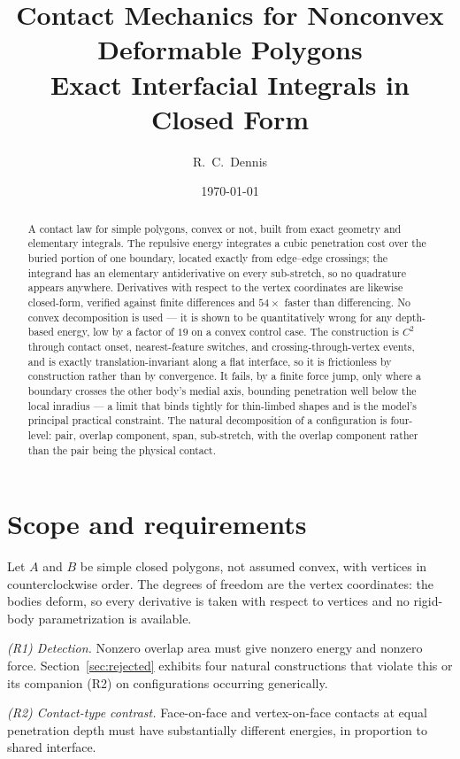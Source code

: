 \documentclass[11pt]{article}
\title{Contact Mechanics for Nonconvex Deformable Polygons\\[0.3em]
\large Exact Interfacial Integrals in Closed Form}
\author{R.\ C.\ Dennis}
\date{\today}
\begin{document}
\maketitle

\begin{abstract}
\noindent
A contact law for simple polygons, convex or not, built from exact geometry and elementary integrals. The repulsive energy integrates a cubic penetration cost over the buried portion of one boundary, located exactly from edge--edge crossings; the integrand has an elementary antiderivative on every sub-stretch, so no quadrature appears anywhere. Derivatives with respect to the vertex coordinates are likewise closed-form, verified against finite differences and $54\times$ faster than differencing. No convex decomposition is used --- it is shown to be quantitatively wrong for any depth-based energy, low by a factor of $19$ on a convex control case. The construction is $C^2$ through contact onset, nearest-feature switches, and crossing-through-vertex events, and is exactly translation-invariant along a flat interface, so it is frictionless by construction rather than by convergence. It fails, by a finite force jump, only where a boundary crosses the other body's medial axis, bounding penetration well below the local inradius --- a limit that binds tightly for thin-limbed shapes and is the model's principal practical constraint. The natural decomposition of a configuration is four-level: pair, overlap component, span, sub-stretch, with the overlap component rather than the pair being the physical contact.
\end{abstract}

\section{Scope and requirements}
\label{sec:scope}

Let $A$ and $B$ be simple closed polygons, not assumed convex, with vertices in counterclockwise order. The degrees of freedom are the vertex coordinates: the bodies deform, so every derivative is taken with respect to vertices and no rigid-body parametrization is available.

\emph{(R1) Detection.} Nonzero overlap area must give nonzero energy and nonzero force. Section~\ref{sec:rejected} exhibits four natural constructions that violate this or its companion (R2) on configurations occurring generically.

\emph{(R2) Contact-type contrast.} Face-on-face and vertex-on-face contacts at equal penetration depth must have substantially different energies, in proportion to shared interface.
\end{document}
